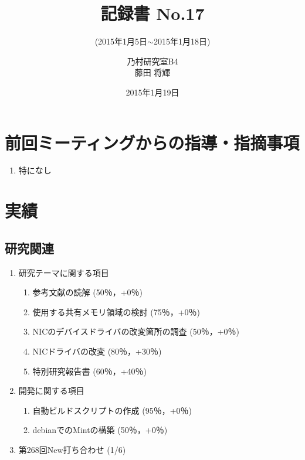 \documentclass[fleqn, 14pt]{extarticle}
\subtitle{(2015年1月5日$\sim$2015年1月18日)}
\author{乃村研究室B4\\藤田 将輝}
\date{2015年1月19日}
\title{記録書 No.17}
\begin{document}
\maketitle
\section{前回ミーティングからの指導・指摘事項}
\label{sec-1}
\begin{enumerate}
\item 特になし
\newline
\hfill

\end{enumerate}




\section{実績}
\label{sec-2}

\subsection{研究関連}
\label{sec-2-1}
\begin{enumerate}
    \item 研究テーマに関する項目
    \hfill
    \label{enum-research1}
    \begin{enumerate}

        \item 参考文献の読解
        \hfill
        \label{enum-1-A}
        (50％，+0％)
        \item 使用する共有メモリ領域の検討
        \hfill
        \label{enum-1-B}
        (75％，+0％)
        \item NICのデバイスドライバの改変箇所の調査
        \hfill
        \label{enum-1-C}
        (50％，+0％)
        \item NICドライバの改変
        \hfill
        \label{enum-1-D}
        (80％，+30％)
        \item 特別研究報告書
        \hfill
        \label{enum-1-E}
        (60％，+40％)

    \end{enumerate}
    \item 開発に関する項目
    \hfill
    \label{enum-research2}
    \begin{enumerate}

        \item 自動ビルドスクリプトの作成
        \hfill
        \label{enum-2-A}
        (95％，+0％)
        \item debianでのMintの構築
        \hfill
        \label{enum-2-A}
        (50％，+0％)
    \end{enumerate}
    \item 第268回New打ち合わせ 
    \hfill
    \label{enum-research3}
    (1/6)
    \end{enumerate}
\end{document}
